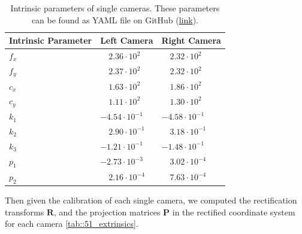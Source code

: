 \begin{table}
	\centering
	\begin{tabular}{lll}
		Intrinsic Parameter & Left Camera & Right Camera\\
		\hline
		$f_x$ & $\quad2.36\cdot10^2$ & $\quad2.32\cdot10^2$ \\
		$f_y$ & $\quad2.37\cdot10^2$ & $\quad2.32\cdot10^2$ \\
		$c_x$ & $\quad1.63\cdot10^2$ & $\quad1.86\cdot10^2$ \\
		$c_y$ & $\quad1.11\cdot10^2$ & $\quad1.30\cdot10^2$ \\
		$k_1$ & $-4.54\cdot10^{-1}$ & $-4.58\cdot10^{-1}$ \\
		$k_2$ & $\quad2.90\cdot10^{-1}$  & $\quad3.18\cdot10^{-1}$  \\
		$k_3$ & $-1.21\cdot10^{-1}$ & $-1.48\cdot10^{-1}$ \\
		$p_1$ & $-2.73\cdot10^{-3}$ & $\quad3.02\cdot10^{-4}$  \\
		$p_2$ & $\quad2.16\cdot10^{-4}$  & $\quad7.63\cdot10^{-4}$		
	\end{tabular}
	\caption{Intrinsic parameters of single cameras. These parameters can be found as YAML file on GitHub (\href{https://github.com/mhubii/nmpc_pattern_generator/tree/master/libs/io_module}{link}).\label{tab::51_intrinsics}}
\end{table}
Then given the calibration of each single camera, we computed the rectification transforms $\bm{R}$, and the projection matrices $\bm{P}$ in the rectified coordinate system for each camera \ref{tab::51_extrinsics}.
